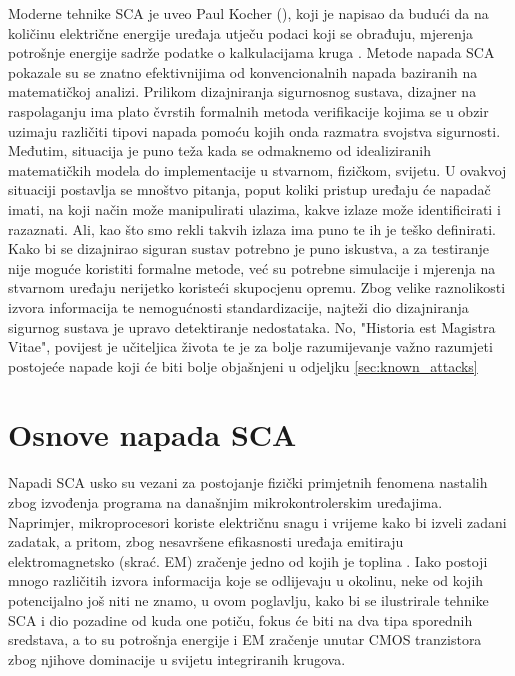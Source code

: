 \documentclass[times, utf8, diplomski]{fer}
\begin{document}
Moderne tehnike SCA je uveo Paul Kocher (\citeyear{kocher1996timing, kocher1999differential, kocher2004security}), koji je napisao da budući da na količinu električne energije uređaja utječu podaci koji se obrađuju, mjerenja potrošnje energije sadrže podatke o kalkulacijama kruga \citep{kocher2011introduction}. Metode napada SCA pokazale su se znatno efektivnijima od konvencionalnih napada baziranih na matematičkoj analizi. Prilikom dizajniranja sigurnosnog sustava, dizajner na raspolaganju ima plato čvrstih formalnih metoda verifikacije kojima se u obzir uzimaju različiti tipovi napada pomoću kojih onda razmatra svojstva sigurnosti. Međutim, situacija je puno teža kada se odmaknemo od idealiziranih matematičkih modela do implementacije u stvarnom, fizičkom, svijetu. U ovakvoj situaciji postavlja se mnoštvo pitanja, poput koliki pristup uređaju će napadač imati, na koji način može manipulirati ulazima, kakve izlaze može identificirati i razaznati. Ali, kao što smo rekli takvih izlaza ima puno te ih je teško definirati. Kako bi se dizajnirao siguran sustav potrebno je puno iskustva, a za testiranje nije moguće koristiti formalne metode, već su potrebne simulacije i mjerenja na stvarnom uređaju nerijetko koristeći skupocjenu opremu. Zbog velike raznolikosti izvora informacija te nemogućnosti standardizacije, najteži dio dizajniranja sigurnog sustava je upravo detektiranje nedostataka. No, "Historia est Magistra Vitae", povijest je učiteljica života te je za bolje razumijevanje važno razumjeti postojeće napade koji će biti bolje objašnjeni u odjeljku \ref{sec:known_attacks}

\section{Osnove napada SCA}

Napadi SCA usko su vezani za postojanje fizički primjetnih fenomena nastalih zbog izvođenja programa na današnjim mikrokontrolerskim uređajima. Naprimjer, mikroprocesori koriste električnu snagu i vrijeme kako bi izveli zadani zadatak, a pritom, zbog nesavršene efikasnosti uređaja emitiraju elektromagnetsko (skrać. EM) zračenje jedno od kojih je toplina \citep{standaert2010introduction}. Iako postoji mnogo različitih izvora informacija koje se odlijevaju u okolinu, neke od kojih potencijalno još niti ne znamo, u ovom poglavlju, kako bi se ilustrirale tehnike SCA i dio pozadine od kuda one potiču, fokus će biti na dva tipa sporednih sredstava, a to su potrošnja energije i EM zračenje unutar CMOS tranzistora zbog njihove dominacije u svijetu integriranih krugova.
\end{document}
